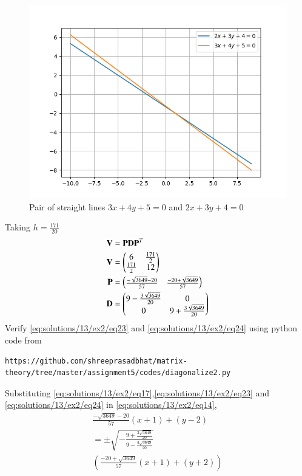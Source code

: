 \begin{figure}[!ht]
	\centering
	\includegraphics[width=\columnwidth]{./solutions/13/ex2/fig/figure_1.png}
	\caption{Pair of straight lines $3x + 4y + 5 = 0$ and $2x + 3y + 4 = 0$}
	\label{eq:solutions/13/ex2/fig:figure1}
\end{figure}
{Taking $h=\frac{171}{20}$}
\begin{align}
	\mathbf{V} &= \mathbf{P}\mathbf{D}\mathbf{P}^T\\
	\mathbf{V} &= \begin{pmatrix} 6 & \frac{171}{2}\\ \frac{171}{2} & 12\end{pmatrix}\\
	\label{eq:solutions/13/ex2/eq23}\mathbf{P} &= \begin{pmatrix}\frac{-\sqrt{3649} - 20}{57} & \frac{-20 + \sqrt{3649}}{57}\end{pmatrix}\\
	\label{eq:solutions/13/ex2/eq24}\mathbf{D} &= \begin{pmatrix}9 - \frac{3\sqrt{3649}}{20} & 0\\ 0 & 9 + \frac{3\sqrt{3649}}{20}\end{pmatrix}
\end{align}
Verify  \eqref{eq:solutions/13/ex2/eq23} and \eqref{eq:solutions/13/ex2/eq24} using python code from
\begin{lstlisting}
https://github.com/shreeprasadbhat/matrix-theory/tree/master/assignment5/codes/diagonalize2.py
\end{lstlisting}
Substituting \eqref{eq:solutions/13/ex2/eq17},\eqref{eq:solutions/13/ex2/eq23} and \eqref{eq:solutions/13/ex2/eq24} in \eqref{eq:solutions/13/ex2/eq14}, 
\begin{multline}\label{eq:solutions/13/ex2/eq25}
	\frac{-\sqrt{3649} - 20}{57}(x+1) + (y-2) \\= \pm 
	\sqrt{-\frac{9 + \frac{3\sqrt{3649}}{20}}{9 - \frac{3\sqrt{3649}}{20}}}\\
	\left(\frac{-20 + \sqrt{3649}}{57}(x+1) + (y+2)\right)
\end{multline}
